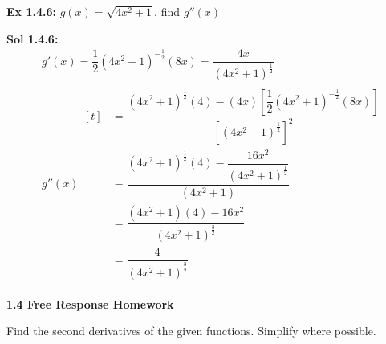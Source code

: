 \begin{tcolorbox}[example]
    \textbf{Ex 1.4.6: } $g(x) = \sqrt{4x^2 + 1}$, find $g''(x)$
\end{tcolorbox}
\begin{tcolorbox}[solution]
    \textbf{Sol 1.4.6: } \begin{align*}
        & g'(x) = \dfrac{1}{2}\left(4x^2 + 1\right)^{-\frac{1}{2}}(8x) = \dfrac{4x}{\left(4x^2 + 1\right)^{\frac{1}{2}}} \\[11pt]
        & g''(x) \begin{aligned}[t]
            & = \dfrac{\left(4x^2 + 1\right)^{\frac{1}{2}}(4) - (4x)\left[\dfrac{1}{2}\left(4x^2 + 1\right)^{-\frac{1}{2}}(8x)\right]}{\left[\left(4x^2 + 1\right)^{\frac{1}{2}}\right]^2} \\[11pt]
            & = \dfrac{{\left(4x^2 + 1\right)^{\frac{1}{2}}}(4) - \dfrac{16x^2}{\left(4x^2 + 1\right)^{\frac{1}{2}}}}{\left(4x^2 + 1\right)} \\[11pt]
            & = \dfrac{\left(4x^2 + 1\right)(4) - 16x^2}{\left(4x^2 + 1\right)^{\frac{3}{2}}} \\[11pt]
            & = \boxed{\dfrac{4}{\left(4x^2 + 1\right)^{\frac{3}{2}}}}
        \end{aligned}
    \end{align*}
\end{tcolorbox}

\newpage

\textbf{\large{1.4 Free Response Homework}} \par

Find the second derivatives of the given functions. Simplify where possible. \par

 \\[11pt]
 \\[11pt]
 \\[11pt] 
 \\[11pt]
 \\[11pt]
 \\[11pt]
 \\[11pt]
 \\[11pt]
 \\[11pt]

